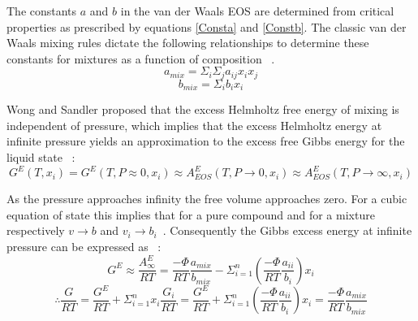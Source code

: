 				The constants $a$ and $b$ in the van der Waals EOS are determined from critical properties as prescribed by equations \ref{Consta} and \ref{Constb}. The classic van der Waals mixing rules dictate the following relationships to determine these constants for mixtures as a function of composition ~\cite{ThermophysicalProperties}.
				\begin{equation}
					a_{mix} = \Sigma_{i}\Sigma_{j} a_{ij}x_{i}x_{j} 
				\end{equation}
				\begin{equation}
					b_{mix} = \Sigma_{i} b_{i}x_{i}
				\end{equation}
				
				
				Wong and Sandler proposed that the excess Helmholtz free energy of mixing is independent of pressure, which implies that the excess Helmholtz energy at infinite pressure yields an approximation to the excess free Gibbs energy for the liquid state ~\cite{WongSandler}:
				\begin{equation}
					G^{E}(T, x_{i}) = G^{E}(T, P \approx 0, x_{i}) \approx A_{EOS}^{E}(T, P \rightarrow 0, x_{i}) \approx A_{EOS}^E(T, P \rightarrow \infty, x_{i})
				\end{equation} 				
				
				 As the pressure approaches infinity the free volume approaches zero. For a cubic equation of state this implies that for a pure compound and for a mixture respectively $ v \rightarrow b$ and $v_{i} \rightarrow b_{i}$~\cite{Vidal, WongSandler}. Consequently the Gibbs excess energy at infinite pressure can be expressed as ~\cite{HuronVidal, Vidal}:
				 \begin{equation}
				 	G^{E} \approx \frac{A^{E}_{\infty}}{RT} = \frac{-\Phi}{RT} \frac{a_{mix}}{b_{mix}} -\Sigma_{i = 1}^{n}\left(\frac{-\Phi}{RT} \frac{a_{ii}}{b_{i}}\right)x_{i}
				\end{equation}
				\begin{equation}
					\therefore  \dfrac{G}{RT} = \dfrac{G^{E}}{RT} + \Sigma_{i=1}^{n}x_{i}\dfrac{G_{i}}{RT} = \dfrac{G^{E}}{RT} +\Sigma_{i=1}^{n}\left(\frac{-\Phi}{RT} \frac{a_{ii}}{b_{i}}\right)x_{i} = \frac{-\Phi}{RT} \frac{a_{mix}}{b_{mix}} \label{GibbsParam1}
				\end{equation}
				
